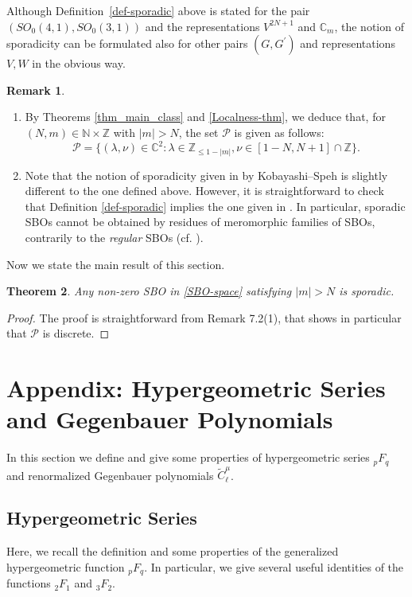 \documentclass[12pt, pdflatex, a4paper]{article}
\theoremstyle{plain}
\newtheorem{thm}{Theorem}[section]
\theoremstyle{definition}
\newtheorem{rem}[thm]{Remark}
\def\C{{\mathbb C}}
\def\Geg{\widetilde{C}}
\def\N{{\mathbb N}}
\def\P{\mathcal{P}}
\def\Z{{\mathbb Z}}
\begin{document}
Although Definition~\ref{def-sporadic} above is stated for the pair $(SO_0(4,1), SO_0(3,1))$ and the representations $V^{2N+1}$ and $\C_m$, the notion of sporadicity can be formulated also for other pairs $(G, G^\prime)$ and representations $V, W$ in the obvious way.

\begin{rem}
\begin{enumerate}[topsep = 0pt, left = 0pt, label=\normalfont{(\arabic*)}]
\item By Theorems \ref{thm_main_class} and \ref{Localness-thm}, we deduce that, for $(N,m) \in \N\times \Z$ with $|m| > N$, the set $\P$ is given as follows:
\begin{equation*}
\P = \{(\lambda, \nu) \in \C^2: 
\lambda \in \Z_{\leq 1-|m|}, \nu \in [1-N, N+1]\cap\Z\}.
\end{equation*}

\item Note that the notion of sporadicity given in \cite{KS18} by Kobayashi--Speh is slightly different to the one defined above. However, it is straightforward to check that Definition \ref{def-sporadic} implies the one given in \cite{KS18}. In particular, sporadic SBOs cannot be obtained by residues of meromorphic families of SBOs, contrarily to the \emph{regular} SBOs (cf. \cite{KS18}).
\end{enumerate}
\end{rem}

Now we state the main result of this section.

\begin{thm}\label{thm-sporadicity} Any non-zero SBO in \eqref{SBO-space} satisfying $|m| > N$ is sporadic.
\end{thm}

\begin{proof}
The proof is straightforward from Remark 7.2(1), that shows in particular that $\P$ is discrete.
\end{proof}



\section{Appendix: Hypergeometric Series and Gegenbauer Polynomials}\label{section-appendix}
In this section we define and give some properties of hypergeometric series ${}_pF_q$ and renormalized Gegenbauer polynomials $\Geg_\ell^\mu$.

\subsection{Hypergeometric Series}
Here, we recall the definition and some properties of the generalized hypergeometric function ${}_pF_q$. In particular, we give several useful identities of the functions ${}_2F_1$ and ${}_3F_2$.
\end{document}
